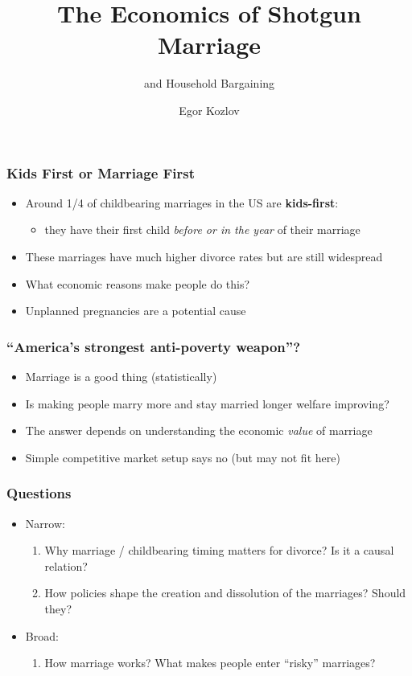 \documentclass[aspectratio=169]{beamer}
\title{The Economics of Shotgun Marriage}
\subtitle{and Household Bargaining}
\author{Egor Kozlov}
\institute{
  Department of Economics\\
  Northwestern University}
\let\olditem\item
\renewcommand{\item}{%
\olditem\vspace{\fill}}
\begin{document}
\begin{frame}[plain]
\addtocounter{framenumber}{-1}
\date{\scriptsize}
\titlepage
\end{frame}


\begin{frame}
\frametitle{Kids First or Marriage First}
\begin{itemize}
\item Around 1/4 of childbearing marriages in the US are \textbf{kids-first}:
\begin{itemize}
\item they have their first child \textit{before or in the year} of their marriage
\end{itemize}
\item These marriages have much higher divorce rates but are still widespread
\item What economic reasons make people do this? 
\item Unplanned pregnancies are a potential cause
\end{itemize}
\end{frame}

\begin{frame}
\frametitle{``America's strongest anti-poverty weapon''?}
\begin{itemize}
\item Marriage is a good thing (statistically)
\item Is making people marry more and stay married longer welfare improving?
\item The answer depends on understanding the economic \emph{value} of marriage
\item Simple competitive market setup says no (but may not fit here)
\end{itemize}
\end{frame}

\begin{frame}
\frametitle{Questions}
\begin{itemize}
\item Narrow: \begin{enumerate}
\item Why marriage / childbearing timing matters for divorce? Is it a causal relation?
\item How policies shape the creation and dissolution of the marriages? Should they?
\end{enumerate}
\item Broad:
\begin{enumerate}
\item How marriage works? What makes people enter ``risky'' marriages?
\end{enumerate}
\end{itemize}
\end{frame}
\end{document}

